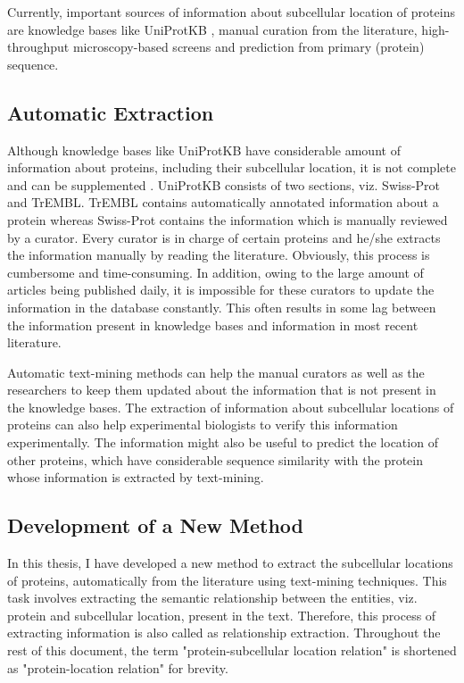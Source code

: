 Currently, important sources of information about subcellular location of proteins are knowledge bases like UniProtKB \cite{magrane2011uniprot}, manual curation from the literature, high-throughput microscopy-based screens and prediction from primary (protein) sequence.

\subsection{Automatic Extraction}

Although knowledge bases like UniProtKB \cite{magrane2011uniprot} have considerable amount of information about proteins, including their subcellular location, it is not complete and can be supplemented \cite{goldberg2015linked}. UniProtKB consists of two sections, viz. Swiss-Prot and TrEMBL. TrEMBL contains automatically annotated information about a protein whereas Swiss-Prot contains the information which is manually reviewed by a curator. Every curator is in charge of certain proteins and he/she extracts the information manually by reading the literature. Obviously, this process is cumbersome and time-consuming. In addition, owing to the large amount of articles being published daily, it is impossible for these curators to update the information in the database constantly. This often results in some lag between the information present in knowledge bases and information in most recent literature.

Automatic text-mining methods can help the manual curators as well as the researchers to keep them updated about the information that is not present in the knowledge bases. The extraction of information about subcellular locations of proteins can also help experimental biologists to verify this information experimentally. The information might also be useful to predict the location of other proteins, which have considerable sequence similarity with the protein whose information is extracted by text-mining.

\subsection{Development of a New Method}

In this thesis, I have developed a new method to extract the subcellular locations of proteins, automatically from the literature using text-mining techniques. This task involves extracting the semantic relationship between the entities, viz. protein and subcellular location, present in the text. Therefore, this process of extracting information is also called as relationship extraction. Throughout the rest of this document, the term "protein-subcellular location relation" is shortened  as "protein-location relation" for brevity.

